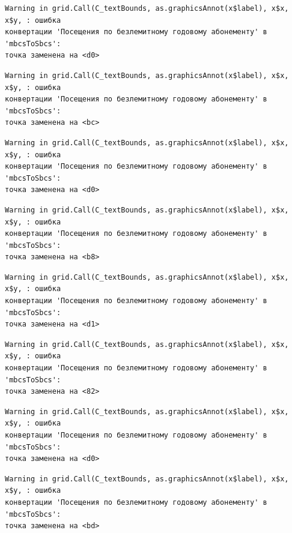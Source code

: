 \documentclass[
  letterpaper,
  DIV=11,
  numbers=noendperiod]{scrreprt}
\begin{document}
\begin{verbatim}
Warning in grid.Call(C_textBounds, as.graphicsAnnot(x$label), x$x, x$y, : ошибка
конвертации 'Посещения по безлемитному годовому абонементу' в 'mbcsToSbcs':
точка заменена на <d0>
\end{verbatim}

\begin{verbatim}
Warning in grid.Call(C_textBounds, as.graphicsAnnot(x$label), x$x, x$y, : ошибка
конвертации 'Посещения по безлемитному годовому абонементу' в 'mbcsToSbcs':
точка заменена на <bc>
\end{verbatim}

\begin{verbatim}
Warning in grid.Call(C_textBounds, as.graphicsAnnot(x$label), x$x, x$y, : ошибка
конвертации 'Посещения по безлемитному годовому абонементу' в 'mbcsToSbcs':
точка заменена на <d0>
\end{verbatim}

\begin{verbatim}
Warning in grid.Call(C_textBounds, as.graphicsAnnot(x$label), x$x, x$y, : ошибка
конвертации 'Посещения по безлемитному годовому абонементу' в 'mbcsToSbcs':
точка заменена на <b8>
\end{verbatim}

\begin{verbatim}
Warning in grid.Call(C_textBounds, as.graphicsAnnot(x$label), x$x, x$y, : ошибка
конвертации 'Посещения по безлемитному годовому абонементу' в 'mbcsToSbcs':
точка заменена на <d1>
\end{verbatim}

\begin{verbatim}
Warning in grid.Call(C_textBounds, as.graphicsAnnot(x$label), x$x, x$y, : ошибка
конвертации 'Посещения по безлемитному годовому абонементу' в 'mbcsToSbcs':
точка заменена на <82>
\end{verbatim}

\begin{verbatim}
Warning in grid.Call(C_textBounds, as.graphicsAnnot(x$label), x$x, x$y, : ошибка
конвертации 'Посещения по безлемитному годовому абонементу' в 'mbcsToSbcs':
точка заменена на <d0>
\end{verbatim}

\begin{verbatim}
Warning in grid.Call(C_textBounds, as.graphicsAnnot(x$label), x$x, x$y, : ошибка
конвертации 'Посещения по безлемитному годовому абонементу' в 'mbcsToSbcs':
точка заменена на <bd>
\end{verbatim}
\end{document}

